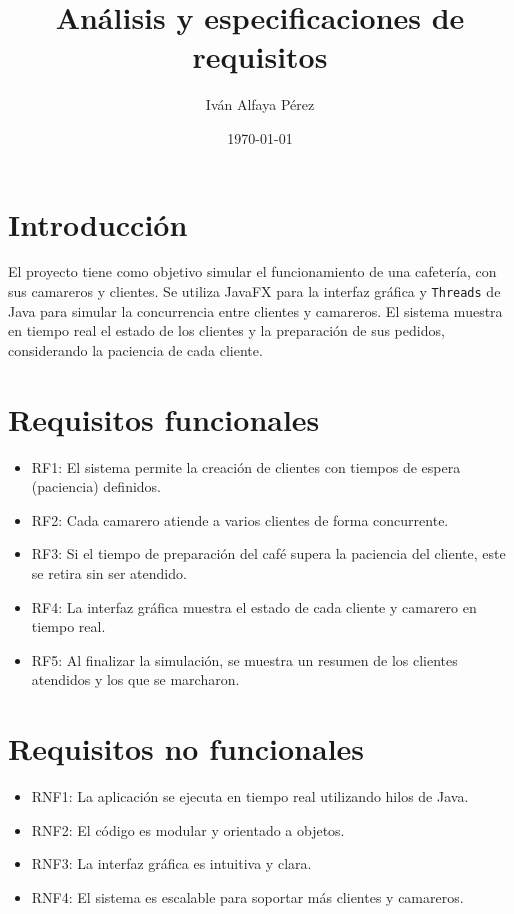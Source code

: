\documentclass{article}
\title{Análisis y especificaciones de requisitos}
\author{Iván Alfaya Pérez}
\date{\today}
\begin{document}
\maketitle

\clearpage 
\tableofcontents 
\clearpage 

\section{Introducción}
El proyecto tiene como objetivo simular el funcionamiento de una cafetería, con sus camareros y clientes.
Se utiliza JavaFX para la interfaz gráfica y \texttt{Threads} de Java para simular la concurrencia entre clientes y camareros.  
El sistema muestra en tiempo real el estado de los clientes y la preparación de sus pedidos, considerando la paciencia de cada cliente.

\section{Requisitos funcionales}
\begin{itemize}
    \item RF1: El sistema permite la creación de clientes con tiempos de espera (paciencia) definidos.
    \item RF2: Cada camarero atiende a varios clientes de forma concurrente.
    \item RF3: Si el tiempo de preparación del café supera la paciencia del cliente, este se retira sin ser atendido.
    \item RF4: La interfaz gráfica muestra el estado de cada cliente y camarero en tiempo real.
    \item RF5: Al finalizar la simulación, se muestra un resumen de los clientes atendidos y los que se marcharon.
\end{itemize}

\section{Requisitos no funcionales}
\begin{itemize}
    \item RNF1: La aplicación se ejecuta en tiempo real utilizando hilos de Java.
    \item RNF2: El código es modular y orientado a objetos.
    \item RNF3: La interfaz gráfica es intuitiva y clara.
    \item RNF4: El sistema es escalable para soportar más clientes y camareros.
\end{itemize}
\end{document}
